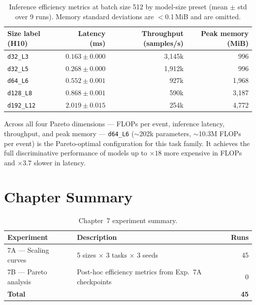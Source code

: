 \begin{table}[h]
\centering\small
\caption{Inference efficiency metrics at batch size 512 by model-size preset (mean $\pm$ std over 9 runs). Memory standard deviations are $<$0.1\,MiB and are omitted.}
\label{tab:ch7_inference}
\begin{tabular}{lrrr}
\toprule
Size label (H10) & Latency (ms) & Throughput (samples/s) & Peak memory (MiB) \\
\midrule
\texttt{d32\_L3}   & $0.163 \pm 0.000$ & 3,145k & 996  \\
\texttt{d32\_L5}   & $0.268 \pm 0.000$ & 1,912k & 996  \\
\texttt{d64\_L6}   & $0.552 \pm 0.001$ &   927k & 1,968 \\
\texttt{d128\_L8}  & $0.868 \pm 0.001$ &   590k & 3,187 \\
\texttt{d192\_L12} & $2.019 \pm 0.015$ &   254k & 4,772 \\
\bottomrule
\end{tabular}
\end{table}

Across all four Pareto dimensions — FLOPs per event, inference latency, throughput, and peak memory — \texttt{d64\_L6} ($\sim$202k parameters, $\sim$10.3M FLOPs per event) is the Pareto-optimal configuration for this task family. It achieves the full discriminative performance of models up to $\times 18$ more expensive in FLOPs and $\times 3.7$ slower in latency.

\section*{Chapter Summary}
\label{sec:ch7_summary}

\begin{table}[h]
\centering\small
\caption{Chapter~7 experiment summary.}
\label{tab:ch7_summary}
\begin{tabular}{llr}
\toprule
Experiment & Description & Runs \\
\midrule
7A — Scaling curves  & 5 sizes $\times$ 3 tasks $\times$ 3 seeds & 45 \\
7B — Pareto analysis & Post-hoc efficiency metrics from Exp.~7A checkpoints & 0 \\
\midrule
\textbf{Total} & & \textbf{45} \\
\bottomrule
\end{tabular}
\end{table}

